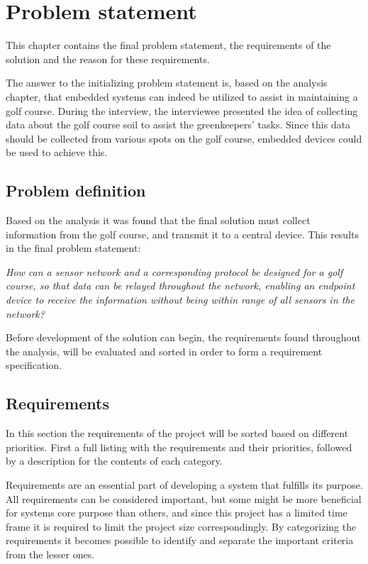 \chapter{Problem statement}
This chapter contains the final problem statement, the requirements of the solution and the reason for these requirements.

The answer to the initializing problem statement is, based on the analysis chapter, that embedded systems can indeed be utilized to assist in maintaining a golf course. During the interview, the interviewee presented the idea of collecting data about the golf course soil to assist the greenkeepers' tasks. Since this data should be collected from various spots on the golf course, embedded devices could be used to achieve this.

\section{Problem definition}
Based on the analysis it was found that the final solution must collect information from the golf course, and transmit it to a central device. This results in the final problem statement:

\textit{How can a sensor network and a corresponding protocol be designed for a golf course, so that data can be relayed throughout the network, enabling an endpoint device to receive the information without being within range of all sensors in the network?}

Before development of the solution can begin, the requirements found throughout the analysis, will be evaluated and sorted in order to form a requirement specification.

\section{Requirements}\label{cha:requirements}
In this section the requirements of the project will be sorted based on different priorities. First a full listing with the requirements and their priorities, followed by a description for the contents of each category.

Requirements are an essential part of developing a system that fulfills its purpose. All requirements can be considered important, but some might be more beneficial for systems core purpose than others, and since this project has a limited time frame it is required to limit the project size correspondingly. By categorizing the requirements it becomes possible to identify and separate the important criteria from the lesser ones.

